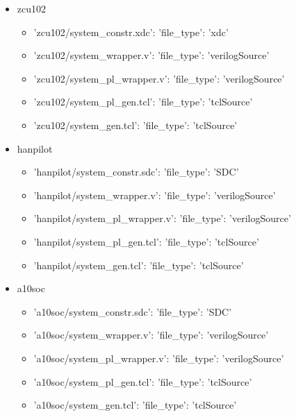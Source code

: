 \begin{itemize}
\item zcu102
	\begin{itemize}
	\item {'zcu102/system\_constr.xdc': {'file\_type': 'xdc'}}
	\item {'zcu102/system\_wrapper.v': {'file\_type': 'verilogSource'}}
	\item {'zcu102/system\_pl\_wrapper.v': {'file\_type': 'verilogSource'}}
	\item {'zcu102/system\_pl\_gen.tcl': {'file\_type': 'tclSource'}}
	\item {'zcu102/system\_gen.tcl': {'file\_type': 'tclSource'}}
	\end{itemize}
\item hanpilot
	\begin{itemize}
	\item {'hanpilot/system\_constr.sdc': {'file\_type': 'SDC'}}
	\item {'hanpilot/system\_wrapper.v': {'file\_type': 'verilogSource'}}
	\item {'hanpilot/system\_pl\_wrapper.v': {'file\_type': 'verilogSource'}}
	\item {'hanpilot/system\_pl\_gen.tcl': {'file\_type': 'tclSource'}}
	\item {'hanpilot/system\_gen.tcl': {'file\_type': 'tclSource'}}
	\end{itemize}
\item a10soc
	\begin{itemize}
	\item {'a10soc/system\_constr.sdc': {'file\_type': 'SDC'}}
	\item {'a10soc/system\_wrapper.v': {'file\_type': 'verilogSource'}}
	\item {'a10soc/system\_pl\_wrapper.v': {'file\_type': 'verilogSource'}}
	\item {'a10soc/system\_pl\_gen.tcl': {'file\_type': 'tclSource'}}
	\item {'a10soc/system\_gen.tcl': {'file\_type': 'tclSource'}}
	\end{itemize}
\end{itemize}
